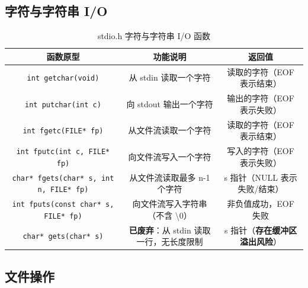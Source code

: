 \subsection{字符与字符串 I/O}

\begin{table}[H]
\centering
\small
\renewcommand{\arraystretch}{1.6}
\begin{tabulary}{\linewidth}{CCC}
\toprule
\textbf{函数原型} & \textbf{功能说明} & \textbf{返回值} \\ \midrule
\texttt{int getchar(void)} & 从 stdin 读取一个字符 & 读取的字符（EOF 表示结束） \\ 
\texttt{int putchar(int c)} & 向 stdout 输出一个字符 & 输出的字符（EOF 表示失败） \\ 
\texttt{int fgetc(FILE* fp)} & 从文件流读取一个字符 & 读取的字符（EOF 表示结束） \\ 
\texttt{int fputc(int c, FILE* fp)} & 向文件流写入一个字符 & 写入的字符（EOF 表示失败） \\ 
\texttt{char* fgets(char* s, int n, FILE* fp)} & 从文件流读取最多 n-1 个字符 & s 指针（NULL 表示失败/结束） \\ 
\texttt{int fputs(const char* s, FILE* fp)} & 向文件流写入字符串（不含 \textbackslash 0） & 非负值成功，EOF 失败 \\ 
\texttt{char* gets(char* s)} & \textbf{已废弃}：从 stdin 读取一行，无长度限制 & s 指针（\textbf{存在缓冲区溢出风险}） \\ \bottomrule
\end{tabulary}
\caption{stdio.h 字符与字符串 I/O 函数}
\label{tab:stdio_char}
\end{table}

\subsection{文件操作}

